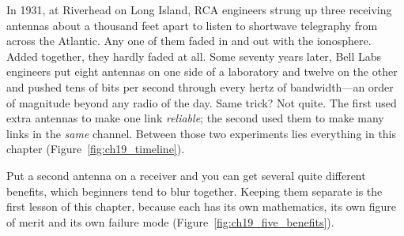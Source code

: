 In 1931, at Riverhead on Long Island, RCA engineers strung up three receiving
antennas about a thousand feet apart to listen to shortwave telegraphy from across the Atlantic. Any
one of them faded in and out with the ionosphere. Added together, they hardly faded at all. Some seventy
years later, Bell Labs engineers put eight antennas on one side of a laboratory and twelve on the
other and pushed tens of bits per second through every hertz of bandwidth---an order of magnitude
beyond any radio of the day. Same trick? Not quite. The first used extra antennas to make one link
\emph{reliable}; the second used them to make many links in the \emph{same} channel. Between those
two experiments lies everything in this chapter (Figure~\ref{fig:ch19_timeline}).


Put a second antenna on a receiver and you can get several quite different benefits, which
beginners tend to blur together. Keeping them separate is the first lesson of this chapter,
because each has its own mathematics, its own figure of merit and its own failure mode
(Figure~\ref{fig:ch19_five_benefits}).

